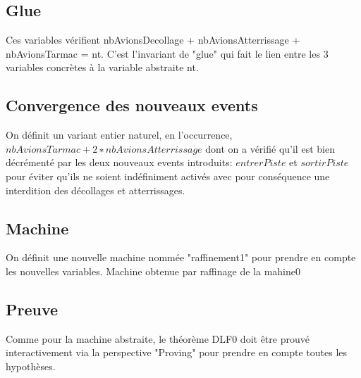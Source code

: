 \subsection{Glue}Ces variables vérifient nbAvionsDecollage + nbAvionsAtterrissage + nbAvionsTarmac = nt. C'est l'invariant de "glue" qui fait le lien entre les 3 variables concrètes à la variable abstraite nt.

\subsection{Convergence des nouveaux events}

On définit un variant entier naturel, en l'occurrence, $nbAvionsTarmac + 2 ∗ nbAvionsAtterrissage$ dont on a vérifié qu'il est bien décrémenté par les deux nouveaux events introduits: $entrerPiste$ et $sortirPiste$ pour éviter qu'ils ne soient indéfiniment activés avec pour conséquence une interdition des décollages et atterrissages.

\subsection{Machine}
 On définit une nouvelle machine nommée "raffinement1" pour prendre en compte les nouvelles variables. Machine obtenue par raffinage de la mahine0
 
 \subsection{Preuve}
 
 Comme pour la machine abstraite, le théorème DLF0 doit être prouvé interactivement via la perspective "Proving" pour prendre en compte toutes les hypothèses.
 
